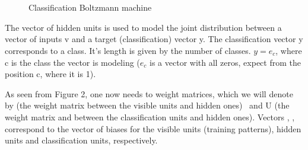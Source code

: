 \ \ \ \ \ \ \ \ \ \ \ \ \ \ \ \ \ \ \ \ \ \ \ \begin{figure}[h]
  \ \ \ \ \ \ \ \ \ \ \centering
  \caption{Classification Boltzmann machine}
\end{figure}



The vector of hidden units is used to model the joint distribution between a
vector of inputs v and a target (classification) vector y. The classification
vector y corresponds to a class. It's length is given by the number of
classes. $y = e_c$, where c is the class the vector is modeling ($e_c$ is a
vector with all zeros, expect from the position c, where it is 1).

As seen from Figure 2, one now needs to weight matrices, which we will denote
by (the weight matrix between the visible units and hidden ones) \
and U (the weight matrix and between the classification units and hidden
ones). Vectors \tmtextit{b}, \tmtextit{c}, \tmtextit{d} correspond to the
vector of biases for the visible units (training patterns), hidden units and
classification units, respectively.

